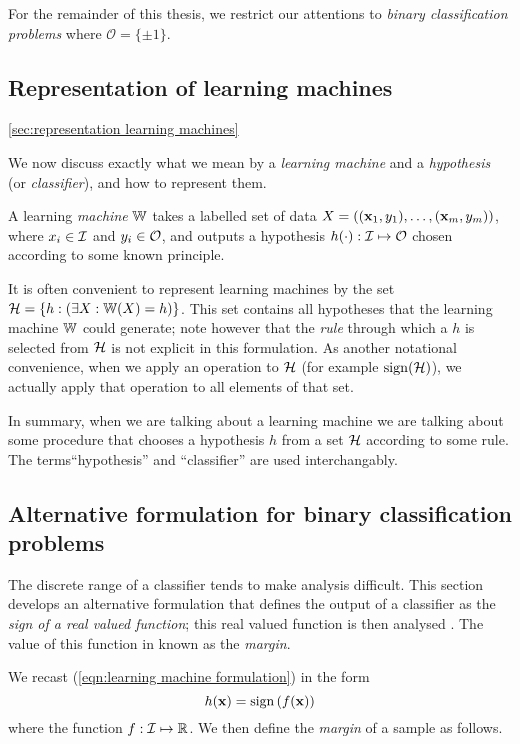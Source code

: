 For the remainder of this thesis, we restrict our attentions to
\emph{binary classification problems} where $\mathcal{O} = \{\pm
1\}$.


\subsection{Representation of learning machines}
\ref{sec:representation learning machines}

We now discuss exactly what we mean by a \emph{learning machine} and a
\emph{hypothesis} (or \emph{classifier}), and how to represent them.

A learning \emph{machine} $\mathbb{W}$ takes a labelled set of data $X =
((\mathbf{x}_1, y_1), \ldots, (\mathbf{x}_m, y_m))$, where $x_i \in \mathcal{I}$ and
$y_i \in \mathcal{O}$, and outputs a hypothesis $h(\cdot) : \mathcal{I} \mapsto
\mathcal{O}$ chosen according to some known principle.

It is often convenient to represent learning machines by the set
$\mathcal{H} = \{h : \left( \exists X : \mathbb{W}(X) = h \right) \}$.  This set
contains all hypotheses that the learning machine $\mathbb{W}$ could
generate; note however that the \emph{rule} through which a $h$ is
selected from $\mathcal{H}$ is not explicit in this formulation. 
As another notational convenience, when we apply an operation to $\mathcal{H}$
(for example $\mathrm{sign}(\mathcal{H})$), we actually apply that operation to all
elements of that set.

In summary, when we are talking about a learning machine we are
talking about some procedure that chooses a hypothesis $h$ from a set
$\mathcal{H}$ according to some rule.  The terms``hypothesis'' and
``classifier'' are used interchangably.


\subsection{Alternative formulation for binary classification problems}
\label{sec:margin formulation}
The discrete range of a classifier tends to make analysis difficult.
This section develops an alternative formulation that defines the
output of a classifier as the  \emph{sign of a real valued function};
this real valued function is then analysed .  The value of this
function in known as the \emph{margin}.
 
We recast (\ref{eqn:learning machine formulation}) in the form
%
\begin{equation}
h(\mathbf{x}) = \mathrm{sign} \left( f(\mathbf{x}) \right)
\label{eqn:marginal classification formulation}
\end{equation}
%
where the function $f : \mathcal{I} \mapsto \mathbb{R}$.  We then
define the \emph{margin} of a sample as follows.


